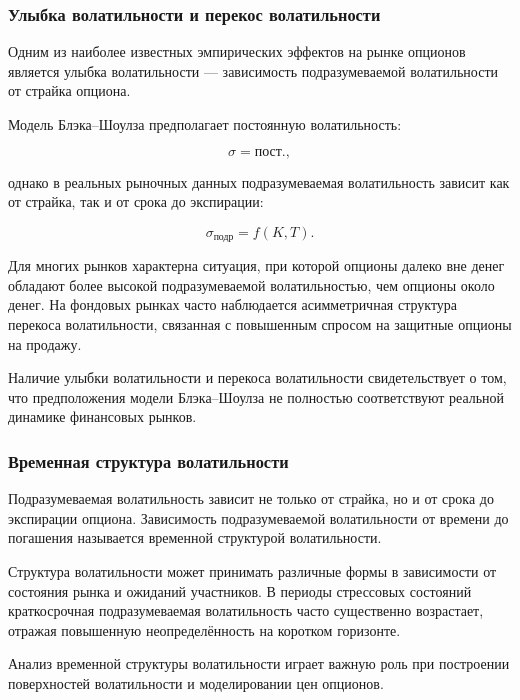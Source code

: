 \documentclass[11pt,a4paper]{article}
\begin{document}
\subsubsection{Улыбка волатильности и перекос волатильности}

Одним из наиболее известных эмпирических эффектов на рынке опционов является улыбка волатильности --- зависимость подразумеваемой волатильности от страйка опциона.

Модель Блэка--Шоулза предполагает постоянную волатильность:

\begin{equation}
\sigma = \text{пост.},
\end{equation}

однако в реальных рыночных данных подразумеваемая волатильность зависит как от страйка, так и от срока до экспирации:

\begin{equation}
\sigma_{\text{подр}} = f(K, T).
\end{equation}

Для многих рынков характерна ситуация, при которой опционы далеко вне денег обладают более высокой подразумеваемой волатильностью, чем опционы около денег. На фондовых рынках часто наблюдается асимметричная структура перекоса волатильности, связанная с повышенным спросом на защитные опционы на продажу.

Наличие улыбки волатильности и перекоса волатильности свидетельствует о том, что предположения модели Блэка--Шоулза не полностью соответствуют реальной динамике финансовых рынков.

\subsubsection{Временная структура волатильности}

Подразумеваемая волатильность зависит не только от страйка, но и от срока до экспирации опциона. Зависимость подразумеваемой волатильности от времени до погашения называется временной структурой волатильности.

Структура волатильности может принимать различные формы в зависимости от состояния рынка и ожиданий участников. В периоды стрессовых состояний краткосрочная подразумеваемая волатильность часто существенно возрастает, отражая повышенную неопределённость на коротком горизонте.

Анализ временной структуры волатильности играет важную роль при построении поверхностей волатильности и моделировании цен опционов.
\end{document}

